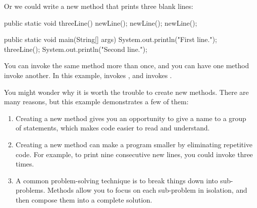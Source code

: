 Or we could write a new method that prints three blank lines:

\begin{code}
    public static void threeLine() {
        newLine();
        newLine();
        newLine();
    }

    public static void main(String[] args) {
        System.out.println("First line.");
        threeLine();
        System.out.println("Second line.");
    }
\end{code}

You can invoke the same method more than once, and you can have one method invoke another.
In this example,  invokes , and  invokes .


You might wonder why it is worth the trouble to create new methods.
There are many reasons, but this example demonstrates a few of them:

\begin{enumerate}

\item Creating a new method gives you an opportunity to give a name to a group of statements, which makes code easier to read and understand.

\item Creating a new method can make a program smaller by eliminating repetitive code.
For example, to print nine consecutive new lines, you could invoke  three times.

\item A common problem-solving technique is to break things down into sub-problems.
Methods allow you to focus on each sub-problem in isolation, and then compose them into a complete solution.

\end{enumerate}


